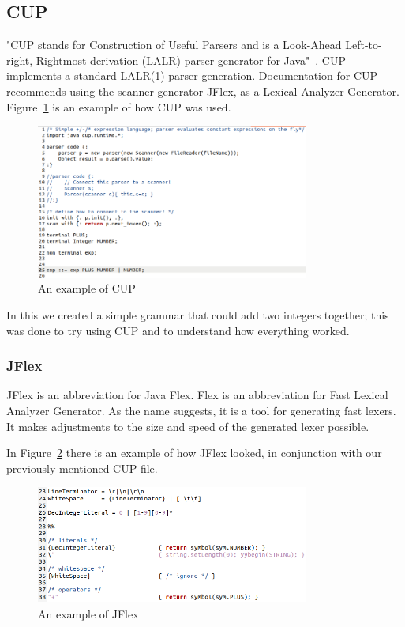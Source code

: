 
\subsection{CUP}
"CUP stands for Construction of Useful Parsers and is a Look-Ahead Left-to-right, Rightmost derivation (LALR) parser generator for Java"~\cite{cupParserGenerator}. CUP implements a standard LALR(1) parser generation. Documentation for CUP recommends using the scanner generator JFlex, as a Lexical Analyzer Generator. Figure~\ref{fig:cup_example} is an example of how CUP was used.


\begin{figure}[htb!]
  \centering
  \includegraphics[width=0.8\textwidth]{figures/Cup_Example.png}
  \caption{An example of CUP}
  \label{fig:cup_example}
\end{figure}

In this we created a simple grammar that could add two integers together; this was done to try using CUP and to understand how everything worked.


\subsubsection{JFlex}
JFlex is an abbreviation for Java Flex. Flex is an abbreviation for Fast Lexical Analyzer Generator. As the name suggests, it is a tool for generating fast lexers. It makes adjustments to the size and speed of the generated lexer possible.

In Figure~\ref{fig:JFlex_example} there is an example of how JFlex looked, in conjunction with our previously mentioned CUP file.

\begin{figure}[htb!]
  \centering
  \includegraphics[width=0.8\textwidth]{figures/JFlex_Example.png}
  \caption{An example of JFlex}
  \label{fig:JFlex_example}
\end{figure}

